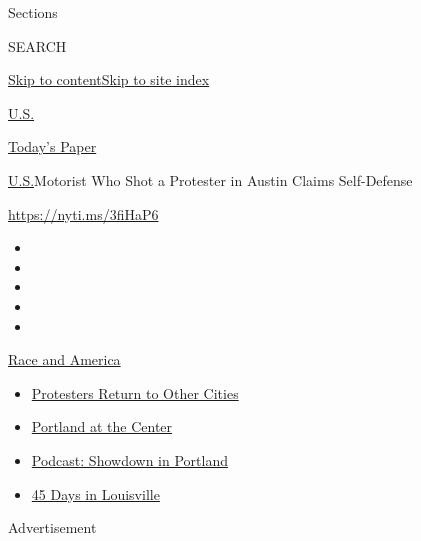 Sections

SEARCH

\protect\hyperlink{site-content}{Skip to
content}\protect\hyperlink{site-index}{Skip to site index}

\href{https://www.nytimes.com/section/us}{U.S.}

\href{https://myaccount.nytimes.com/auth/login?response_type=cookie\&client_id=vi}{}

\href{https://www.nytimes.com/section/todayspaper}{Today's Paper}

\href{/section/us}{U.S.}\textbar{}Motorist Who Shot a Protester in
Austin Claims Self-Defense

\url{https://nyti.ms/3fiHaP6}

\begin{itemize}
\item
\item
\item
\item
\item
\end{itemize}

\href{https://www.nytimes.com/news-event/george-floyd-protests-minneapolis-new-york-los-angeles?action=click\&pgtype=Article\&state=default\&region=TOP_BANNER\&context=storylines_menu}{Race
and America}

\begin{itemize}
\tightlist
\item
  \href{https://www.nytimes.com/2020/07/26/us/protests-portland-seattle-trump.html?action=click\&pgtype=Article\&state=default\&region=TOP_BANNER\&context=storylines_menu}{Protesters
  Return to Other Cities}
\item
  \href{https://www.nytimes.com/2020/07/24/us/portland-oregon-protests-white-race.html?action=click\&pgtype=Article\&state=default\&region=TOP_BANNER\&context=storylines_menu}{Portland
  at the Center}
\item
  \href{https://www.nytimes.com/2020/07/23/podcasts/the-daily/portland-protests.html?action=click\&pgtype=Article\&state=default\&region=TOP_BANNER\&context=storylines_menu}{Podcast:
  Showdown in Portland}
\item
  \href{https://www.nytimes.com/interactive/2020/07/16/us/black-lives-matter-protests-louisville-breonna-taylor.html?action=click\&pgtype=Article\&state=default\&region=TOP_BANNER\&context=storylines_menu}{45
  Days in Louisville}
\end{itemize}

Advertisement


